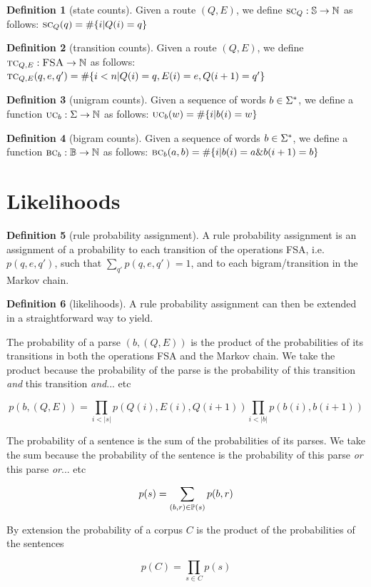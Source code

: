 \documentclass[12pt]{article}
\theoremstyle{definition}
\newtheorem{definition}{Definition}[section]
\begin{document}
\begin{definition}[state counts]
  Given a route $(Q,E)$, we define $\text{\textsc{sc}}_Q : \mathbb{S} \rightarrow\mathbb{N}$ as follows: $\text{\textsc{sc}}_Q(q) = \#\{ i | Q(i)=q \}$
\end{definition}


\begin{definition}[transition counts]
  Given a route $(Q,E)$, we define $\text{\textsc{tc}}_{Q,E} : \textsc{FSA} \rightarrow\mathbb{N}$ as follows: $\text{\textsc{tc}}_{Q,E}(q,e,q') = \#\{ i<n | Q(i)=q,E(i)=e,Q({i+1})=q'\}$
\end{definition}

\begin{definition}[unigram counts]
  Given a sequence of words $b\in\Sigma^*$, we define a function $\text{\textsc{uc}}_b : \Sigma \rightarrow\mathbb{N}$ as follows: $\text{\textsc{uc}}_b(w) = \#\{ i | b(i) = w \}$
\end{definition}


\begin{definition}[bigram counts]
  Given a sequence of words $b\in\Sigma^*$, we define a function $\text{\textsc{bc}}_{b} : \mathbb{B} \rightarrow\mathbb{N}$ as follows: $\text{\textsc{bc}}_b(a,b) = \#\{ i | b(i)=a \& b(i+1) = b \}$
\end{definition}


\section{Likelihoods}

\begin{definition}[rule probability assignment]
A rule probability assignment is an assignment of a probability to each transition of the operations FSA, i.e. $p(q,e,q')$, such that $\sum_{q'}p(q,e,q')=1$, and to each bigram/transition in the Markov chain.
\end{definition}


\begin{definition}[likelihoods]
A rule probability assignment can then be extended in a straightforward way to yield. 

The probability of a parse $(b,(Q,E))$ is the product of the probabilities of its transitions in both the operations FSA and the Markov chain. We take the product because the probability of the parse is the probability of this transition \textit{and} this transition \textit{and}... etc

$$p(b,(Q,E)) = \prod_{i<|s|} p(Q(i),E(i),Q(i+1)) \prod_{i<|b|} p(b(i),b(i+1))$$


The probability of a sentence is the sum of the probabilities of its parses. We take the sum because the probability of the sentence is the probability of this parse \textit{or} this parse \textit{or}... etc

$$p(s) = \sum_{(b,r)\in\mathbb{P}(s)} p(b,r)$$

 By extension the probability of a corpus $C$ is the product of the probabilities of the sentences

$$p(C)=\prod_{s\in C}p(s)$$
\end{definition}
\end{document}

